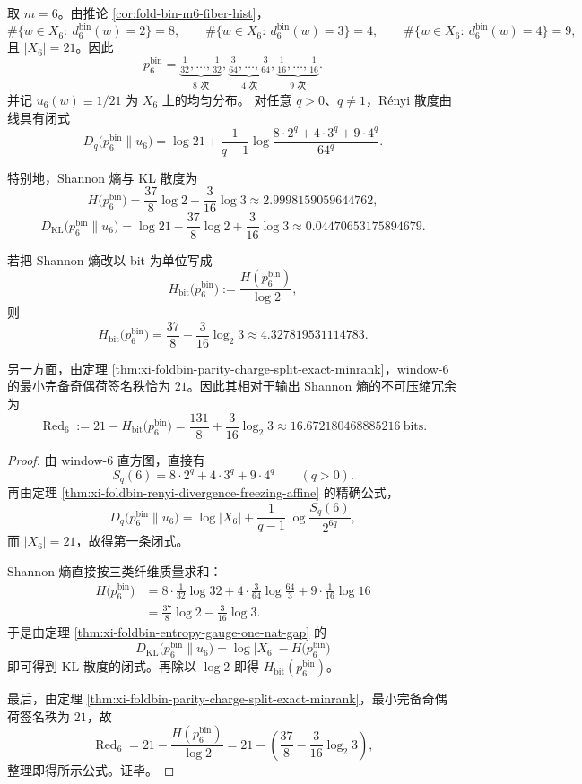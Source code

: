 \begin{proposition}\label{prop:xi-window6-renyi-divergence-parity-charge-redundancy}
取 \(m=6\)。由推论 \ref{cor:fold-bin-m6-fiber-hist}，
\[
\#\{w\in X_6:\ d_6^{\mathrm{bin}}(w)=2\}=8,\qquad
\#\{w\in X_6:\ d_6^{\mathrm{bin}}(w)=3\}=4,\qquad
\#\{w\in X_6:\ d_6^{\mathrm{bin}}(w)=4\}=9,
\]
且 \(|X_6|=21\)。因此
\[
p_6^{\mathrm{bin}}
=
\underbrace{\tfrac{1}{32},\dots,\tfrac{1}{32}}_{8\text{ 次}},
\underbrace{\tfrac{3}{64},\dots,\tfrac{3}{64}}_{4\text{ 次}},
\underbrace{\tfrac{1}{16},\dots,\tfrac{1}{16}}_{9\text{ 次}}.
\]
并记 \(u_6(w)\equiv 1/21\) 为 \(X_6\) 上的均匀分布。
对任意 \(q>0\)、\(q\neq 1\)，Rényi 散度曲线具有闭式
\[
\boxed{\;
D_q\!\bigl(p_6^{\mathrm{bin}}\|u_6\bigr)
=
\log 21+\frac{1}{q-1}
\log\frac{8\cdot 2^q+4\cdot 3^q+9\cdot 4^q}{64^q}.\;}
\]

特别地，Shannon 熵与 KL 散度为
\[
\boxed{\;
H\!\bigl(p_6^{\mathrm{bin}}\bigr)
=
\frac{37}{8}\log 2-\frac{3}{16}\log 3
\approx 2.9998159059644762,\;}
\]
\[
\boxed{\;
D_{\mathrm{KL}}\!\bigl(p_6^{\mathrm{bin}}\|u_6\bigr)
=
\log 21-\frac{37}{8}\log 2+\frac{3}{16}\log 3
\approx 0.04470653175894679.\;}
\]

若把 Shannon 熵改以 bit 为单位写成
\[
H_{\mathrm{bit}}\!\bigl(p_6^{\mathrm{bin}}\bigr)
:=
\frac{H(p_6^{\mathrm{bin}})}{\log 2},
\]
则
\[
\boxed{\;
H_{\mathrm{bit}}\!\bigl(p_6^{\mathrm{bin}}\bigr)
=
\frac{37}{8}-\frac{3}{16}\log_2 3
\approx 4.327819531114783.\;}
\]

另一方面，由定理 \ref{thm:xi-foldbin-parity-charge-split-exact-minrank}，window-\(6\) 的最小完备奇偶荷签名秩恰为 \(21\)。因此其相对于输出 Shannon 熵的不可压缩冗余为
\[
\boxed{\;
\operatorname{Red}_6
:=
21-H_{\mathrm{bit}}\!\bigl(p_6^{\mathrm{bin}}\bigr)
=
\frac{131}{8}+\frac{3}{16}\log_2 3
\approx 16.672180468885216\ \mathrm{bits}.\;}
\]
\end{proposition}
\begin{proof}
由 window-\(6\) 直方图，直接有
\[
S_q(6)=8\cdot 2^q+4\cdot 3^q+9\cdot 4^q
\qquad(q>0).
\]
再由定理 \ref{thm:xi-foldbin-renyi-divergence-freezing-affine} 的精确公式，
\[
D_q\!\bigl(p_6^{\mathrm{bin}}\|u_6\bigr)
=
\log|X_6|+\frac{1}{q-1}\log\frac{S_q(6)}{2^{6q}},
\]
而 \(|X_6|=21\)，故得第一条闭式。

Shannon 熵直接按三类纤维质量求和：
\[
\begin{aligned}
H\!\bigl(p_6^{\mathrm{bin}}\bigr)
&=
8\cdot \frac{1}{32}\log 32
+4\cdot \frac{3}{64}\log \frac{64}{3}
+9\cdot \frac{1}{16}\log 16\\
&=
\frac{37}{8}\log 2-\frac{3}{16}\log 3.
\end{aligned}
\]
于是由定理 \ref{thm:xi-foldbin-entropy-gauge-one-nat-gap} 的
\[
D_{\mathrm{KL}}\!\bigl(p_6^{\mathrm{bin}}\|u_6\bigr)
=
\log|X_6|-H\!\bigl(p_6^{\mathrm{bin}}\bigr)
\]
即可得到 KL 散度的闭式。再除以 \(\log 2\) 即得 \(H_{\mathrm{bit}}(p_6^{\mathrm{bin}})\)。

最后，由定理 \ref{thm:xi-foldbin-parity-charge-split-exact-minrank}，最小完备奇偶荷签名秩为 \(21\)，故
\[
\operatorname{Red}_6
=
21-\frac{H(p_6^{\mathrm{bin}})}{\log 2}
=
21-\left(\frac{37}{8}-\frac{3}{16}\log_2 3\right),
\]
整理即得所示公式。证毕。
\end{proof}

